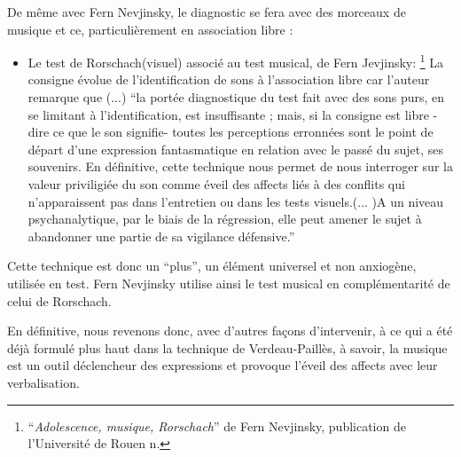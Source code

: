 De même avec Fern Nevjinsky, le diagnostic se fera avec des morceaux
de musique et ce, particulièrement en association libre : 
\begin{itemize}
\item Le test de Rorschach(visuel) associé au test musical, de Fern Jevjinsky:
\footnote{``\emph{Adolescence, musique, Rorschach}'' de Fern Nevjinsky, publication
de l'Université de Rouen n. } La consigne évolue de l'identification de sons à l'association libre
car l'auteur remarque que (...) ``la portée diagnostique du test
fait avec des sons purs, en se limitant à l'identification, est insuffisante
; mais, si la consigne est libre -dire ce que le son signifie- toutes
les perceptions erronnées sont le point de départ d'une expression
fantasmatique en relation avec le passé du sujet, ses souvenirs. En
définitive, cette technique nous permet de nous interroger sur la
valeur priviligiée du son comme éveil des affects liés à des conflits
qui n'apparaissent pas dans l'entretien ou dans les tests visuels.(...
)A un niveau psychanalytique, par le biais de la régression, elle
peut amener le sujet à abandonner une partie de sa vigilance défensive.'' 
\end{itemize}
Cette technique est donc un ``plus'', un élément universel et non
anxiogène, utilisée en test. Fern Nevjinsky utilise ainsi le test
musical en complémentarité de celui de Rorschach.

En définitive, nous revenons donc, avec d'autres façons d'intervenir,
à ce qui a été déjà formulé plus haut dans la technique de Verdeau-Paillès,
à savoir, la musique est un outil déclencheur des expressions et provoque
l'éveil des affects avec leur verbalisation.

